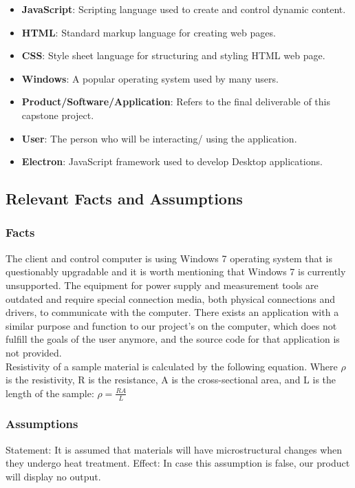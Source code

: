 \documentclass[12pt, titlepage]{article}
\begin{document}
\begin{itemize}
    \item \textbf{JavaScript}: Scripting language used to create and control dynamic content.
    \item \textbf{HTML}: Standard markup language for creating web pages.
    \item \textbf{CSS}: Style sheet language for structuring and styling HTML web page.
    \item \textbf{Windows}: A popular operating system used by many users.
    \item \textbf{Product/Software/Application}: Refers to the final deliverable of this capstone project.
    \item \textbf{User}: The person who will be interacting/ using the application.
    \item \textbf{Electron}: JavaScript framework used to develop Desktop applications.  
\end{itemize}

\subsection{Relevant Facts and Assumptions}
\subsubsection{Facts}
The client and control computer is using Windows 7 operating system that is questionably upgradable and it is worth mentioning that Windows 7 is currently unsupported. The equipment for power supply and measurement tools are outdated and require special connection media, both physical connections and drivers, to communicate with the computer. There exists an application with a similar purpose and function to our project’s on the computer, which does not fulfill the goals of the user anymore, and the source code for that application is not provided.\\

\noindent Resistivity of a sample material is calculated by the following equation. Where $\rho$ is the resistivity, R is the resistance, A is the cross-sectional area, and L is the length of the sample:
$ \rho = \frac{RA}{L} $

\subsubsection{Assumptions}
Statement: It is assumed that materials will have microstructural changes when they undergo heat treatment. 
Effect: In case this assumption is false, our product will display no output. \\
\end{document}
